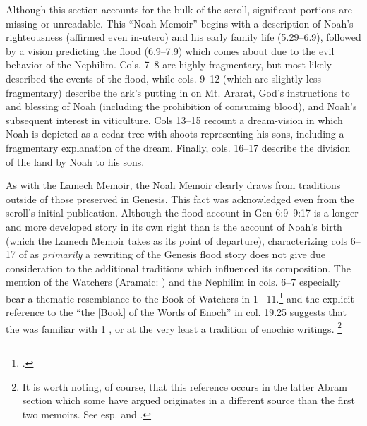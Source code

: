 Although this section accounts for the bulk of the scroll, significant portions are missing or unreadable. This ``Noah Memoir'' begins with a description of Noah's righteousness\autocite{vanderkam_collins-nickelsburg1980} (affirmed even in-utero) and his early family life (5.29--6.9), followed by a vision predicting the flood (6.9--7.9) which comes about due to the evil behavior of the Nephilim. Cols. 7--8 are highly fragmentary, but most likely described the events of the flood, while cols. 9--12 (which are slightly less fragmentary) describe the ark's putting in on Mt. Ararat, God's instructions to  and blessing of Noah (including the prohibition of consuming blood), and Noah's subsequent interest in viticulture. Cols 13--15 recount a dream-vision in which Noah is depicted as a cedar tree with shoots representing his sons, including a fragmentary explanation of the dream. Finally, cols. 16--17 describe the division of the land by Noah to his sons.

As with the Lamech Memoir, the Noah Memoir clearly draws from traditions outside of those preserved in Genesis. This fact was acknowledged even from the scroll's initial publication.\autocite[38]{avigad-yadin1956} Although the flood account in Gen 6:9--9:17 is a longer and more developed story in its own right than is the account of Noah's birth (which the Lamech Memoir takes as its point of departure), characterizing cols 6--17 of \ga as \emph{primarily} a rewriting of the Genesis flood story does not give due consideration to the additional traditions which influenced its composition. The mention of the Watchers (Aramaic: ) and the Nephilim in cols. 6--7 especially bear a thematic resemblance to the Book of Watchers in 1 --11.\footnote{\cite[174]{nickelsburg2005}.} and the explicit reference to the ``the [Book] of the Words of Enoch'' in col. 19.25 suggests that the \ga was familiar with 1 \enoch, or at the very least a tradition of enochic writings.%
%
\footnote{It is worth noting, of course, that this reference occurs in the latter Abram section which some have argued originates in a different source than the first two memoirs. See esp. \cite{bernstein_berthelot-etal2010} and \cite{bernstein_as2010}.}

